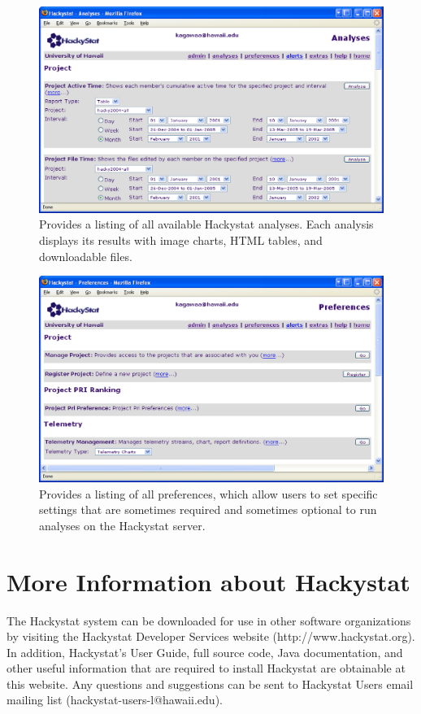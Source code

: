 \begin{figure}[htbp]
  \centering
  \includegraphics[width=1.00\textwidth]{figs/UserInterface/page-analysis.eps}
  \caption[The Hackystat analysis webpage]{Provides a listing of all
    available Hackystat analyses. Each analysis displays its results with
    image charts, HTML tables, and downloadable files.}
  \label{fig:page-analysis}
\end{figure}

\begin{figure}[htbp]
  \centering
  \includegraphics[width=1.00\textwidth]{figs/UserInterface/page-preferences.eps}
  \caption[The Hackystat preferences webpage]{Provides a listing of all
    preferences, which allow users to set specific settings that are
    sometimes required and sometimes optional to run analyses on the
    Hackystat server.}
  \label{fig:page-preferences}
\end{figure}

\clearpage
\section{More Information about Hackystat}
The Hackystat system can be downloaded for use in other software
organizations by visiting the Hackystat Developer Services website
(http://www.hackystat.org). In addition, Hackystat's User Guide, full
source code, Java documentation, and other useful information that are
required to install Hackystat are obtainable at this website. Any questions
and suggestions can be sent to Hackystat Users email mailing list
(hackystat-users-l@hawaii.edu).









